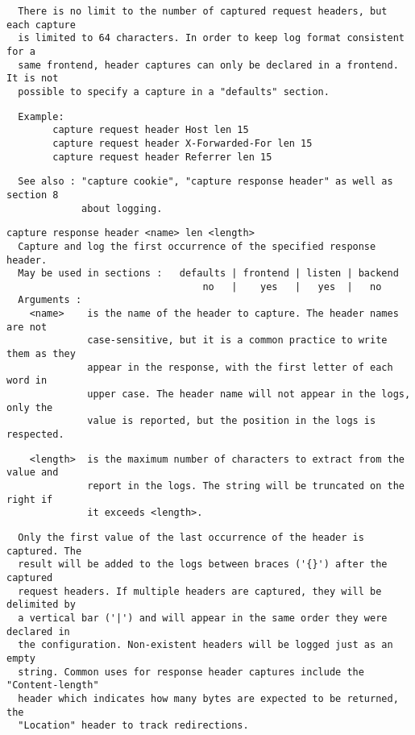 \begin{verbatim}
  There is no limit to the number of captured request headers, but each capture
  is limited to 64 characters. In order to keep log format consistent for a
  same frontend, header captures can only be declared in a frontend. It is not
  possible to specify a capture in a "defaults" section.
\end{verbatim}

\begin{verbatim}
  Example:
        capture request header Host len 15
        capture request header X-Forwarded-For len 15
        capture request header Referrer len 15
\end{verbatim}

\begin{verbatim}
  See also : "capture cookie", "capture response header" as well as section 8
             about logging.
\end{verbatim}

\begin{verbatim}
capture response header <name> len <length>
  Capture and log the first occurrence of the specified response header.
  May be used in sections :   defaults | frontend | listen | backend
                                  no   |    yes   |   yes  |   no
  Arguments :
    <name>    is the name of the header to capture. The header names are not
              case-sensitive, but it is a common practice to write them as they
              appear in the response, with the first letter of each word in
              upper case. The header name will not appear in the logs, only the
              value is reported, but the position in the logs is respected.
\end{verbatim}

\begin{verbatim}
    <length>  is the maximum number of characters to extract from the value and
              report in the logs. The string will be truncated on the right if
              it exceeds <length>.
\end{verbatim}

\begin{verbatim}
  Only the first value of the last occurrence of the header is captured. The
  result will be added to the logs between braces ('{}') after the captured
  request headers. If multiple headers are captured, they will be delimited by
  a vertical bar ('|') and will appear in the same order they were declared in
  the configuration. Non-existent headers will be logged just as an empty
  string. Common uses for response header captures include the "Content-length"
  header which indicates how many bytes are expected to be returned, the
  "Location" header to track redirections.
\end{verbatim}

